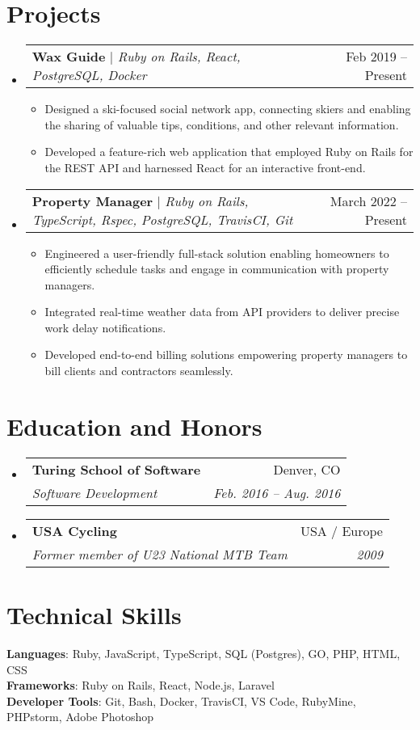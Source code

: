 \documentclass[letterpaper,11pt]{article}
\makeatletter
\newcommand{\resumeItem}[1]{
  \item\small{
    {#1 \vspace{-2pt}}
  }
}
\newcommand{\resumeSubheading}[4]{
  \vspace{-2pt}\item
    \begin{tabular*}{0.97\textwidth}[t]{l@{\extracolsep{\fill}}r}
      \textbf{#1} & #2 \\
      \textit{\small#3} & \textit{\small #4} \\
    \end{tabular*}\vspace{-7pt}
}
\newcommand{\resumeProjectHeading}[2]{
    \item
    \begin{tabular*}{0.97\textwidth}{l@{\extracolsep{\fill}}r}
      \small#1 & #2 \\
    \end{tabular*}\vspace{-7pt}
}
\newcommand{\resumeSubHeadingListStart}{\begin{itemize}[leftmargin=0.15in, label={}]}
\newcommand{\resumeSubHeadingListEnd}{\end{itemize}}
\newcommand{\resumeItemListStart}{\begin{itemize}}
\newcommand{\resumeItemListEnd}{\end{itemize}\vspace{-5pt}}
\makeatother
\begin{document}
\section{Projects}
    \resumeSubHeadingListStart
      \resumeProjectHeading
          {\textbf{Wax Guide} $|$ \emph{Ruby on Rails, React, PostgreSQL, Docker}}{Feb 2019 -- Present}
          \resumeItemListStart
             \resumeItem{Designed a ski-focused social network app, connecting skiers and enabling the sharing of valuable tips, conditions, and other relevant information.}
            \resumeItem{Developed a feature-rich web application that employed Ruby on Rails for the REST API and harnessed React for an interactive front-end.}
          \resumeItemListEnd
      \resumeProjectHeading
          {\textbf{Property Manager} $|$ \emph{Ruby on Rails, TypeScript, Rspec, PostgreSQL, TravisCI, Git}}{March 2022 -- Present}
          \resumeItemListStart
            \resumeItem{Engineered a user-friendly full-stack solution enabling homeowners to efficiently schedule tasks and engage in communication with property managers.}
            \resumeItem{Integrated real-time weather data from API providers to deliver precise work delay notifications.}
            \resumeItem{Developed end-to-end billing solutions empowering property managers to bill clients and contractors seamlessly.}
          \resumeItemListEnd
    \resumeSubHeadingListEnd

\section{Education and Honors}
  \resumeSubHeadingListStart
    \resumeSubheading
      {Turing School of Software}{Denver, CO}
      {Software Development}{Feb. 2016 -- Aug. 2016}
    \resumeSubheading
      {USA Cycling}{USA / Europe}
      {Former member of U23 National MTB Team}{2009}
  \resumeSubHeadingListEnd
%
\section{Technical Skills}
 \begin{itemize}[leftmargin=0.15in, label={}]
    \small{\item{
     \textbf{Languages}{: Ruby, JavaScript, TypeScript, SQL (Postgres), GO, PHP, HTML, CSS} \\
     \textbf{Frameworks}{: Ruby on Rails, React, Node.js, Laravel} \\
     \textbf{Developer Tools}{: Git, Bash, Docker, TravisCI, VS Code, RubyMine, PHPstorm, Adobe Photoshop} \\
    }}
 \end{itemize}

\end{document}
